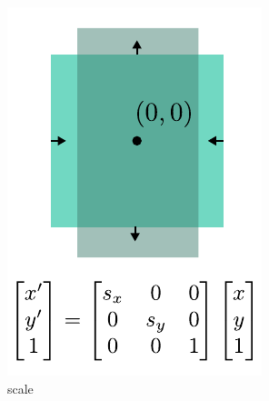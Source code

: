 \begin{figure}[t]
    \begin{subfigure}[t]{0.195\linewidth}
        \centering
        \includegraphics[width=\linewidth]{imgs/scale_affine.pdf}
        \caption{\label{fig:scale_affine} scale}
    \end{subfigure}
    \begin{subfigure}[t]{0.195\linewidth}
        \centering

\end{subfigure}
\end{figure}
